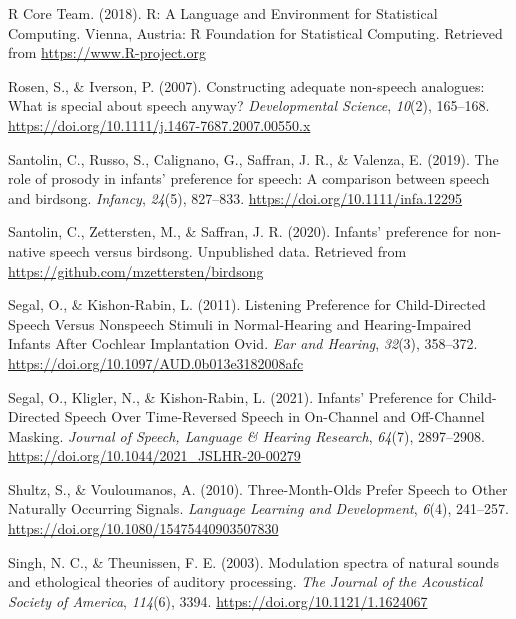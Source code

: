\documentclass[
  man,mask,floatsintext]{apa6}
\newlength{\cslhangindent}
\newlength{\cslentryspacingunit} %
\newenvironment{CSLReferences}[2] %
 {%
  \setlength{\parindent}{0pt}
  \ifodd #1
  \let\oldpar\par
  \def\par{\hangindent=\cslhangindent\oldpar}
  \fi
  \setlength{\parskip}{#2\cslentryspacingunit}
 }%
 {}
\begin{document}
\begin{CSLReferences}{1}{0}
\leavevmode{}%
R Core Team. (2018). R: {A} {Language} and {Environment} for {Statistical} {Computing}. Vienna, Austria: R Foundation for Statistical Computing. Retrieved from \url{https://www.R-project.org}

\leavevmode{}%
Rosen, S., \& Iverson, P. (2007). Constructing adequate non-speech analogues: What is special about speech anyway? \emph{Developmental Science}, \emph{10}(2), 165--168. \url{https://doi.org/10.1111/j.1467-7687.2007.00550.x}

\leavevmode{}%
Santolin, C., Russo, S., Calignano, G., Saffran, J. R., \& Valenza, E. (2019). The role of prosody in infants' preference for speech: {A} comparison between speech and birdsong. \emph{Infancy}, \emph{24}(5), 827--833. \url{https://doi.org/10.1111/infa.12295}

\leavevmode{}%
Santolin, C., Zettersten, M., \& Saffran, J. R. (2020). Infants' preference for non-native speech versus birdsong. {Unpublished} data. Retrieved from \url{https://github.com/mzettersten/birdsong}

\leavevmode{}%
Segal, O., \& Kishon-Rabin, L. (2011). Listening {Preference} for {Child}-{Directed} {Speech} {Versus} {Nonspeech} {Stimuli} in {Normal}-{Hearing} and {Hearing}-{Impaired} {Infants} {After} {Cochlear} {Implantation} {\textbar} {Ovid}. \emph{Ear and Hearing}, \emph{32}(3), 358--372. \url{https://doi.org/10.1097/AUD.0b013e3182008afc}

\leavevmode{}%
Segal, O., Kligler, N., \& Kishon-Rabin, L. (2021). Infants' {Preference} for {Child}-{Directed} {Speech} {Over} {Time}-{Reversed} {Speech} in {On}-{Channel} and {Off}-{Channel} {Masking}. \emph{Journal of Speech, Language \& Hearing Research}, \emph{64}(7), 2897--2908. \url{https://doi.org/10.1044/2021_JSLHR-20-00279}

\leavevmode{}%
Shultz, S., \& Vouloumanos, A. (2010). Three-{Month}-{Olds} {Prefer} {Speech} to {Other} {Naturally} {Occurring} {Signals}. \emph{Language Learning and Development}, \emph{6}(4), 241--257. \url{https://doi.org/10.1080/15475440903507830}

\leavevmode{}%
Singh, N. C., \& Theunissen, F. E. (2003). Modulation spectra of natural sounds and ethological theories of auditory processing. \emph{The Journal of the Acoustical Society of America}, \emph{114}(6), 3394. \url{https://doi.org/10.1121/1.1624067}


\end{CSLReferences}
\end{document}
